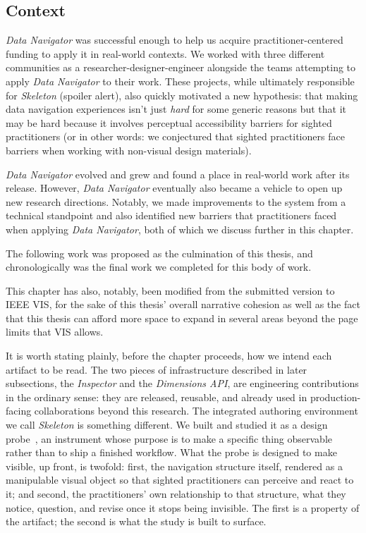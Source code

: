 \documentclass[12pt]{cmuthesis}
\begin{document}
\subsection{Context}

\textit{Data Navigator} was successful enough to help us acquire practitioner-centered funding to apply it in real-world contexts. We worked with three different communities as a researcher-designer-engineer alongside the teams attempting to apply \textit{Data Navigator} to their work. These projects, while ultimately responsible for \textit{Skeleton} (spoiler alert), also quickly motivated a new hypothesis: that making data navigation experiences isn't just \textit{hard} for some generic reasons but that it may be hard because it involves perceptual accessibility barriers for sighted practitioners (or in other words: we conjectured that sighted practitioners face barriers when working with non-visual design materials).

\textit{Data Navigator} evolved and grew and found a place in real-world work after its release. However, \textit{Data Navigator} eventually also became a vehicle to open up new research directions. Notably, we made improvements to the system from a technical standpoint and also identified new barriers that practitioners faced when applying \textit{Data Navigator}, both of which we discuss further in this chapter.

The following work was proposed as the culmination of this thesis, and chronologically was the final work we completed for this body of work.

This chapter has also, notably, been modified from the submitted version to IEEE VIS, for the sake of this thesis' overall narrative cohesion as well as the fact that this thesis can afford more space to expand in several areas beyond the page limits that VIS allows.

It is worth stating plainly, before the chapter proceeds, how we intend each artifact to be read. The two pieces of infrastructure described in later subsections, the \textit{Inspector} and the \textit{Dimensions API}, are engineering contributions in the ordinary sense: they are released, reusable, and already used in production-facing collaborations beyond this research. The integrated authoring environment we call \textit{Skeleton} is something different. We built and studied it as a design probe~\cite{Hutchinson2003TechnologyProbes, Hammad2024GameAware}, an instrument whose purpose is to make a specific thing observable rather than to ship a finished workflow. What the probe is designed to make visible, up front, is twofold: first, the navigation structure itself, rendered as a manipulable visual object so that sighted practitioners can perceive and react to it; and second, the practitioners' own relationship to that structure, what they notice, question, and revise once it stops being invisible. The first is a property of the artifact; the second is what the study is built to surface.
\end{document}
